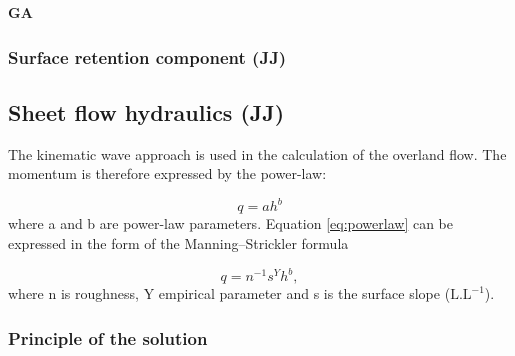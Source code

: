             {\bf GA}
 

 

        \subsubsection{Surface retention component (JJ)}
    \subsection{Sheet flow hydraulics (JJ)}
        The kinematic wave approach is used in the calculation of the overland flow.
        The momentum is therefore expressed by the power-law:

        \begin{equation} 
        q = ah^b
        \label{eq:powerlaw}
        \end{equation}
        where a and b are power-law parameters. Equation \ref{eq:powerlaw} can be
        expressed in the form of the Manning–Strickler formula


        \begin{equation} 
        q = n^{-1} s^Y h^b,
        \label{eq:powerlaw}
        \end{equation}
        where n is roughness,  Y  empirical parameter and s is the surface
        slope ($\mathrm{L.L^{-1}}$).
        \subsubsection{Principle of the solution}


